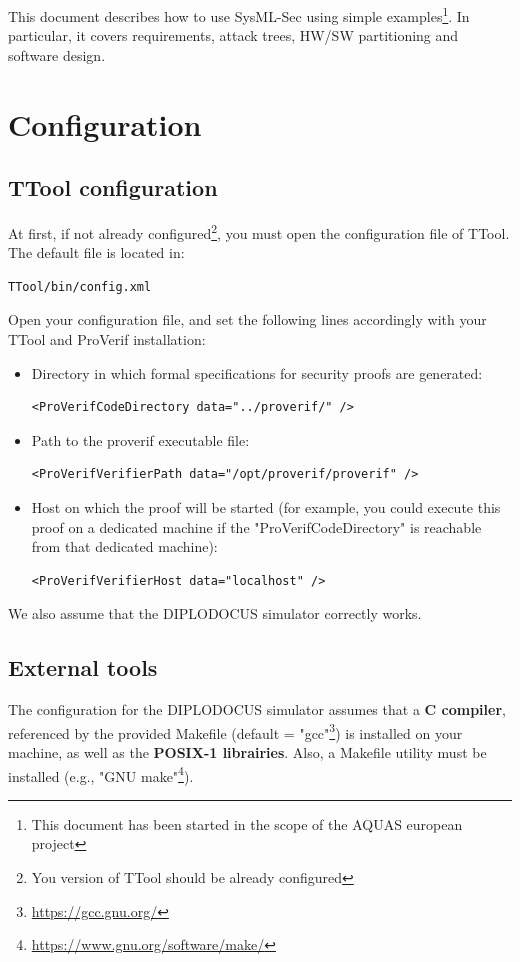 \documentclass[12pt]{article}
\begin{document}
This document describes how to use SysML-Sec using simple examples\footnote{This document has been started in the scope of the AQUAS european project}. In particular, it covers requirements, attack trees, HW/SW partitioning and  software design.

\newpage

\section{Configuration}\label{sec:conf}
\subsection{TTool configuration}
At first, if not already configured\footnote{You version of TTool should be already configured}, you must open the configuration file of TTool. The default file is located in:
\begin{verbatim}
TTool/bin/config.xml
\end{verbatim}
Open your configuration file, and set the following lines accordingly with your TTool and ProVerif installation:
\begin{itemize}
\item Directory in which formal specifications for security proofs are generated:
\begin{verbatim}
<ProVerifCodeDirectory data="../proverif/" />
\end{verbatim}
\item Path to the proverif executable file:
\begin{verbatim}
<ProVerifVerifierPath data="/opt/proverif/proverif" />
\end{verbatim}
\item Host on which the proof will be started (for example, you could execute this proof on a dedicated machine if the "ProVerifCodeDirectory" is reachable from that dedicated machine):
\begin{verbatim}
<ProVerifVerifierHost data="localhost" />
\end{verbatim}
\end{itemize}
We also assume that the DIPLODOCUS simulator correctly works.


\subsection{External tools}
The  configuration for the DIPLODOCUS simulator assumes that a \textbf{C compiler}, referenced by the provided Makefile (default = "gcc"\footnote{\url{https://gcc.gnu.org/}}) is installed on your machine, as well as the \textbf{POSIX-1 librairies}. Also, a Makefile utility must be installed (e.g., "GNU make"\footnote{\url{https://www.gnu.org/software/make/}}).
\end{document}
